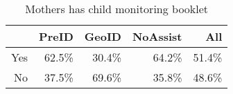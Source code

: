 \begin{table}[ht]
\centering
\begin{tabular}{rrrrr}
  \hline
 & PreID & GeoID & NoAssist & All \\ 
  \hline
Yes & 62.5\% & 30.4\% & 64.2\% & 51.4\% \\ 
  No & 37.5\% & 69.6\% & 35.8\% & 48.6\% \\ 
   \hline
\end{tabular}
\caption{Mothers has child monitoring booklet} 
\end{table}
